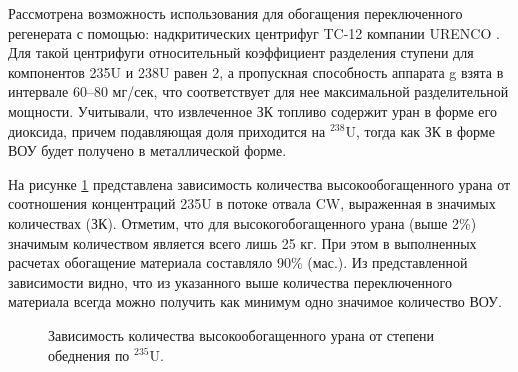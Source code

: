 Рассмотрена возможность использования для обогащения переключенного регенерата с помощью:  надкритических центрифуг TC-12 компании URENCO \cite{Borisevich2014}. Для такой центрифуги относительный коэффициент разделения ступени для компонентов 235U и 238U равен 2, а пропускная способность аппарата g взята в интервале 60–80 мг/сек, что соответствует для нее максимальной разделительной мощности. Учитывали, что извлеченное ЗК топливо содержит уран в форме его диоксида, причем подавляющая доля приходится на  $^{238}$U, тогда как ЗК в форме ВОУ будет получено в металлической форме. 

На рисунке \ref{fig:np1} представлена зависимость количества высокообогащенного урана от соотношения концентраций 235U в потоке отвала CW, выраженная в значимых количествах (ЗК). Отметим, что для высокогобогащенного урана (выше 2\%) значимым количеством является всего лишь 25 кг. При этом в выполненных расчетах обогащение материала составляло 90\% (мас.).  Из представленной зависимости видно, что из указанного выше количества переключенного материала всегда можно получить как минимум одно значимое количество ВОУ.
\begin{figure}[ht]
  \caption{Зависимость количества высокообогащенного урана от степени обеднения по $^{235}$U.}\label{fig:np1}
\end{figure}

